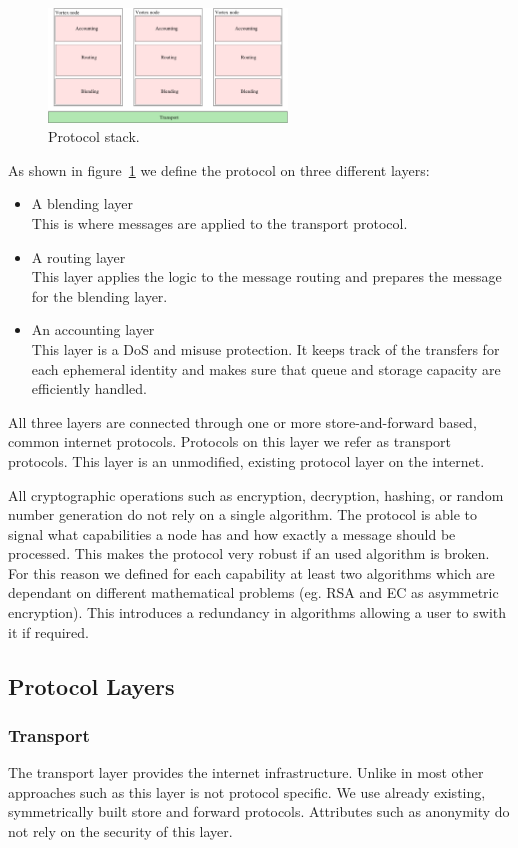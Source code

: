 \documentclass[9pt,journal,compsoc]{IEEEtran}
\begin{document}
\begin{figure}[!t]
\centering
\includegraphics[width=2.5in]{../inc/roughProtocolDesign}
\caption{Protocol stack.}
\label{fig:layers}
\end{figure}
As shown in figure~\ref{fig:layers} we define the protocol on three different layers:
\begin{itemize}
	\item A blending layer\\
	      This is where messages are applied to the transport protocol. 
	\item A routing layer\\
	      This layer applies the logic to the message routing and prepares the message for the blending layer.
	\item An accounting layer\\
	      This layer is a DoS and misuse protection. It keeps track of the transfers for each ephemeral identity and makes sure that queue and storage capacity are efficiently handled.     
\end{itemize}
All three layers are connected through one or more store-and-forward based, common internet protocols. Protocols on this layer we refer as transport protocols. This layer is an unmodified, existing protocol layer on the internet.

All cryptographic operations such as encryption, decryption, hashing, or random number generation do not rely on a single algorithm. The protocol is able to signal what capabilities a node has and how exactly a message should be processed. This makes the protocol very robust if an used algorithm is broken. For this reason we defined for each capability at least two algorithms which are dependant on different mathematical problems (eg. RSA and EC as asymmetric encryption). This introduces a redundancy in algorithms allowing a user to swith it if required.

\subsection{Protocol Layers}
\subsubsection{Transport}
The transport layer provides the internet infrastructure. Unlike in most other approaches such as \cite{tor-design,sherwood-protocol,freenet} this layer is not protocol specific. We use already existing, symmetrically built store and forward protocols. Attributes such as anonymity do not rely on the security of this layer.
\end{document}
